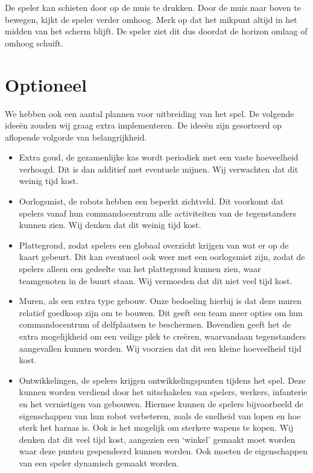 De speler kan schieten door op de muis te drukken. Door de muis naar boven te bewegen, kijkt de speler verder omhoog. Merk op dat het mikpunt altijd in het midden van het scherm blijft. De speler ziet dit dus doordat de horizon omlaag of omhoog schuift.

\section{Optioneel}
\label{sec:OPT}
We hebben ook een aantal plannen voor uitbreiding van het spel. De volgende idee\"en zouden wij graag extra implementeren. De idee\"en zijn gesorteerd op aflopende volgorde van belangrijkheid.

\begin{itemize}
  \item Extra goud, de gezamenlijke kas wordt periodiek met een vaste hoeveelheid verhoogd. Dit is dan additief met eventuele mijnen. Wij verwachten dat dit weinig tijd kost.
  \item Oorlogsmist, de robots hebben een beperkt zichtveld. Dit voorkomt dat spelers vanaf hun commandocentrum alle activiteiten van de tegenstanders kunnen zien. Wij denken dat dit weinig tijd kost.
  \item Plattegrond, zodat spelers een globaal overzicht krijgen van wat er op de kaart gebeurt. Dit kan eventueel ook weer met een oorlogsmist zijn, zodat de spelers alleen een gedeelte van het plattegrond kunnen zien, waar teamgenoten in de buurt staan. Wij vermoeden dat dit niet veel tijd kost.
  \item Muren, als een extra type gebouw. Onze bedoeling hierbij is dat deze muren relatief goedkoop zijn om te bouwen. Dit geeft een team meer opties om hun commandocentrum of delfplaatsen te beschermen. Bovendien geeft het de extra mogelijkheid om een veilige plek te cre\"eren, waarvandaan tegenstanders aangevallen kunnen worden. Wij voorzien dat dit een kleine hoeveelheid tijd kost.
  \item Ontwikkelingen, de spelers krijgen ontwikkelingspunten tijdens het spel. Deze kunnen worden verdiend door het uitschakelen van spelers, werkers, infanterie en het vernietigen van gebouwen. Hiermee kunnen de spelers bijvoorbeeld de eigenschappen van hun robot verbeteren, zoals de snelheid van lopen en hoe sterk het harnas is. Ook is het mogelijk om sterkere wapens te kopen. Wij denken dat dit veel tijd kost, aangezien een `winkel' gemaakt moet worden waar deze punten gespendeerd kunnen worden. Ook moeten de eigenschappen van een speler dynamisch gemaakt worden.

\end{itemize}
